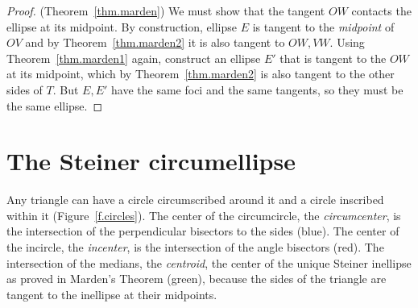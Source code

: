 
\begin{proof} (Theorem~\ref{thm.marden})
We must show that the tangent $OW$ contacts the ellipse at its midpoint. By construction, ellipse $E$ is tangent to the \emph{midpoint} of $OV$ and by Theorem~\ref{thm.marden2} it is also tangent to $OW,VW$. Using Theorem~\ref{thm.marden1} again, construct an ellipse $E'$ that is tangent to the $OW$ at its midpoint, which by Theorem~\ref{thm.marden2} is also tangent to the other sides of $T$. But $E,E'$ have the same foci and the same tangents, so they must be the same ellipse.\hqed
\end{proof}

\section{The Steiner circumellipse}

Any triangle can have a circle circumscribed around it and a circle inscribed within it (Figure~\ref{f.circles}). The center of the circumcircle, the \emph{circumcenter}, is the intersection of the perpendicular bisectors to the sides (blue). The center of the incircle, the \emph{incenter}, is the intersection of the angle bisectors (red). The intersection of the medians, the \emph{centroid}, the center of the unique Steiner inellipse as proved in Marden's Theorem (green), because the sides of the triangle are tangent to the inellipse at their midpoints.


